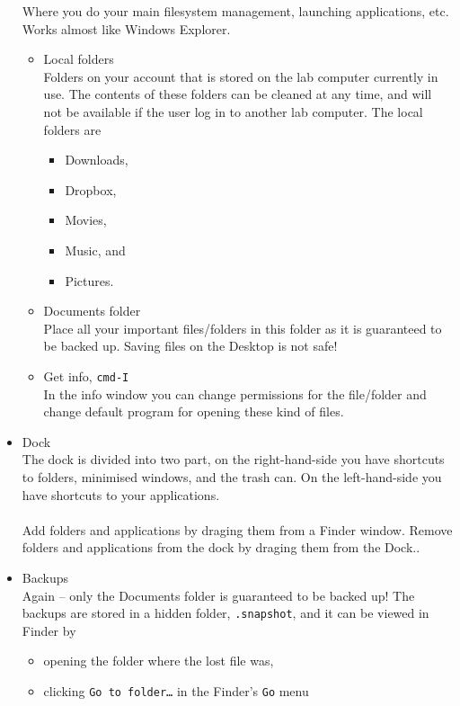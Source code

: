 \documentclass[a4,landscape]{seminar}
\begin{document}
\begin{slide}
\begin{itemize}
    Where you do your main filesystem management, launching applications, etc. Works almost like Windows Explorer.
    \begin{itemize}
    \item Local folders\\[1ex]
      Folders on your account that is stored on the lab computer
      currently in use. The contents of these folders can be cleaned
      at any time, and will not be available if the user log in to
      another lab computer. The local folders are
      \clearpage{}
      \begin{itemize}
      \item Downloads,
      \item Dropbox,
      \item Movies,
      \item Music, and
      \item Pictures.
      \end{itemize}
    \item Documents folder\\[1ex]
      Place all your important files/folders in this folder as it is
      guaranteed to be backed up. Saving files on the Desktop is not
      safe!
    \item Get info, \texttt{cmd-I}\\[1ex]
      In the info window you can change permissions for the
      file/folder and change default program for opening these kind of
      files.
    \end{itemize}
    \clearpage{}
  \item Dock\\[1ex]
    The dock is divided into two part, on the right-hand-side you have
    shortcuts to folders, minimised windows, and the trash can. On the
    left-hand-side you have shortcuts to your applications.\\\\
    Add folders and applications by draging them from a Finder window.
    Remove folders and applications from the dock by draging them from
    the Dock..
  \item Backups\\[1ex]
    Again -- only the Documents folder is guaranteed to be backed up!
    The backups are stored in a hidden folder, \texttt{.snapshot}, and
    it can be viewed in Finder by
    \begin{itemize}
    \item opening the folder where the lost file was,
    \item clicking \texttt{Go to folder\dots} in the Finder's \texttt{Go} menu\\[1ex]

\end{itemize}
\end{itemize}
\end{slide}
\end{document}
